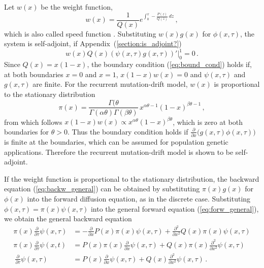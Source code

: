 \documentclass[preprint]{elsarticle}
\newcommand\eg{{\it e.g.,}}
\begin{document}
Let $w(x)$ be the weight function, 
\begin{equation}
    w(x)=\frac1{Q(x)}e^{\int_0^x -\frac{P(z)}{Q(z)}\,dz}\,,
\end{equation}
which is also called speed function \citep[\eg][]{Ewen04,Song12}. Substituting  $w(x)g(x)$ for $\phi(x,\tau)$, the system is self-adjoint, if Appendix~(\ref{section:is_adjoint?})
\begin{equation}\label{eq:bound_cond}
w(x)Q(x)\left(\psi(x,\tau) g(x,\tau)\right)'\big|_0^1=0\,.
\end{equation}
Since $Q(x)=x(1-x)$, the boundary condition (\ref{eq:bound_cond}) holds if, at both boundaries $x=0$ and $x=1$, $x(1-x)w(x)=0$ and  $\psi(x,\tau)$ and $g(x,\tau)$ are finite. For the recurrent mutation-drift model, $w(x)$ is proportional to the stationary distribution 
\begin{equation}
    \pi(x)=\frac{\Gamma(\theta}{\Gamma(\alpha\theta)\Gamma(\beta\theta)}\,x^{\alpha\theta-1}(1-x)^{\beta\theta-1}\,,
\end{equation}
from which follows $x(1-x)w(x)\propto x^{\alpha\theta}(1-x)^{\beta\theta}$, which is zero at both boundaries for $\theta>0$. Thus the boundary condition holds if $\frac{\partial}{\partial x}\big(g(x,\tau)\phi(x,\tau))$ is finite at the boundaries, which can be assumed for population genetic applications. Therefore the recurrent mutation-drift model is shown to be self-adjoint.

If the weight function is proportional to the stationary distribution, the backward equation (\ref{eq:backw_general}) can be obtained by substituting $\pi(x)g(x)$ for $\phi(x)$ into the forward diffusion equation, as in the discrete case. Substituting $\phi(x,\tau)=\pi(x)\psi(x,\tau)$ into the general forward equation (\ref{eq:forw_general}), we obtain the general backward equation
\begin{equation}
\begin{split}
\pi(x)\frac{\partial}{\partial \tau} \psi(x,\tau)&=-\frac{\partial}{\partial x}P(x)\pi(x)\psi(x,\tau)+\frac{\partial^2}{\partial x^2}Q(x)\pi(x) \psi(x,\tau)\\
\pi(x)\frac{\partial}{\partial \tau}\psi(x,t)&=P(x)\pi(x)\frac{\partial}{\partial x}\psi(x,\tau) +Q(x)\pi(x)\frac{\partial^2}{\partial x^2}\psi(x,\tau)\\\
\frac{\partial}{\partial \tau}\psi(x,\tau)&=P(x)\frac{\partial}{\partial x}\psi(x,\tau)+Q(x)\frac{\partial^2}{\partial x^2}\psi(x,\tau)\,.
\end{split}
\end{equation}
\end{document}
